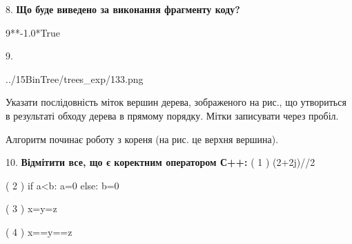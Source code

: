 \documentclass[11pt]{article}
\begin{document}
8. \textbf{Що буде виведено за виконання фрагменту коду?}

9**-1.0*True
\vspace{5mm}

9. 

\begin{center}
	{../15BinTree/trees_exp/133.png}
\end{center}
Указати послідовність міток вершин дерева, зображеного на рис., що утвориться в результаті обходу дерева в прямому порядку. Мітки записувати через пробіл.\par Алгоритм починає роботу з кореня (на рис. це верхня вершина).
\vspace{5mm}

10. %
\textbf{Відмітити все, що є коректним оператором С++:}
( 1 ) (2+2j)//2

( 2 ) if a<b: a=0 else: b=0

( 3 ) x=y=z

( 4 ) x==y==z
\vspace{5mm}

\newpage
\end{document}

